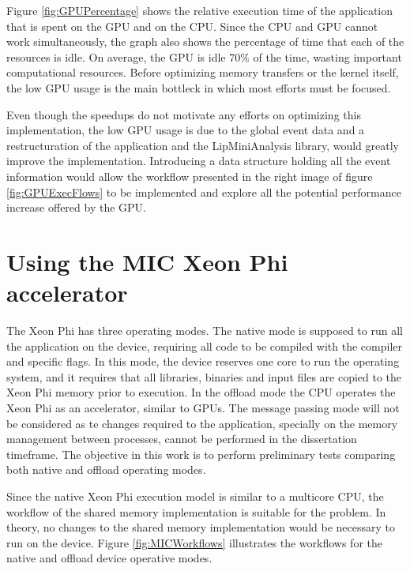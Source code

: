 Figure \ref{fig:GPUPercentage} shows the relative execution time of the application that is spent on the GPU and on the CPU. Since the CPU and GPU cannot work simultaneously, the graph also shows the percentage of time that each of the resources is idle. On average, the GPU is idle 70\% of the time, wasting important computational resources. Before optimizing memory transfers or the kernel itself, the low GPU usage is the main bottleck in which most efforts must be focused.

Even though the speedups do not motivate any efforts on optimizing this implementation, the low GPU usage is due to the global event data and a restructuration of the application and the LipMiniAnalysis library, would greatly improve the implementation. Introducing a data structure holding all the event information would allow the workflow presented in the right image of figure \ref{fig:GPUExecFlows} to be implemented and explore all the potential performance increase offered by the GPU.

\section{Using the \intel MIC Xeon Phi accelerator}
\label{Parallelization:MIC}

The \intel Xeon Phi has three operating modes. The native mode is supposed to run all the application on the device, requiring all code to be compiled with the \intel compiler and specific flags. In this mode, the device reserves one core to run the operating system, and it requires that all libraries, binaries and input files are copied to the Xeon Phi memory prior to execution. In the offload mode the CPU operates the Xeon Phi as an accelerator, similar to GPUs. The message passing mode will not be considered as te changes required to the application, specially on the memory management between processes, cannot be performed in the dissertation timeframe. The objective in this work is to perform preliminary tests comparing both native and offload operating modes.

Since the native Xeon Phi execution model is similar to a multicore CPU, the workflow of the shared memory implementation is suitable for the problem. In theory, no changes to the shared memory implementation would be necessary to run on the device. Figure \ref{fig:MICWorkflows} illustrates the workflows for the native and offload device operative modes.

